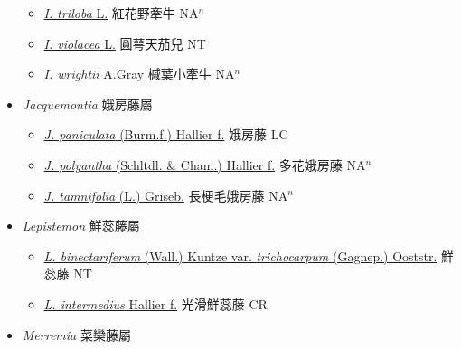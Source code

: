 \begin{itemize}
\begin{itemize}
        \item[] \href{http://www.theplantlist.org/tpl1.1/search?q=Ipomoea+triloba}{\textit{I. triloba} L.}   紅花野牽牛 NA$^n$
        \item[] \href{http://www.theplantlist.org/tpl1.1/search?q=Ipomoea+violacea}{\textit{I. violacea} L.}   圓萼天茄兒 NT
        \item[] \href{http://www.theplantlist.org/tpl1.1/search?q=Ipomoea+wrightii}{\textit{I. wrightii} A.Gray}   槭葉小牽牛 NA$^n$
  \end{itemize}
 \item[] \textit{Jacquemontia} 娥房藤屬
                    
  \begin{itemize}
        \item[] \href{http://www.theplantlist.org/tpl1.1/search?q=Jacquemontia+paniculata}{\textit{J. paniculata} (Burm.f.) Hallier f.}   娥房藤 LC
        \item[] \href{http://www.theplantlist.org/tpl1.1/search?q=Jacquemontia+polyantha}{\textit{J. polyantha} (Schltdl. \& Cham.) Hallier f.}   多花娥房藤 NA$^n$
        \item[] \href{http://www.theplantlist.org/tpl1.1/search?q=Jacquemontia+tamnifolia}{\textit{J. tamnifolia} (L.) Griseb.}   長梗毛娥房藤 NA$^n$
  \end{itemize}
 \item[] \textit{Lepistemon} 鮮蕊藤屬
                    
  \begin{itemize}
        \item[] \href{http://www.theplantlist.org/tpl1.1/search?q=Lepistemon+binectariferum+var.+trichocarpum}{\textit{L. binectariferum} (Wall.) Kuntze var. \textit{trichocarpum} (Gagnep.) Ooststr.}   鮮蕊藤 NT
        \item[] \href{http://www.theplantlist.org/tpl1.1/search?q=Lepistemon+intermedius}{\textit{L. intermedius} Hallier f.}   光滑鮮蕊藤 CR
  \end{itemize}
 \item[] \textit{Merremia} 菜欒藤屬
                    

\end{itemize}
